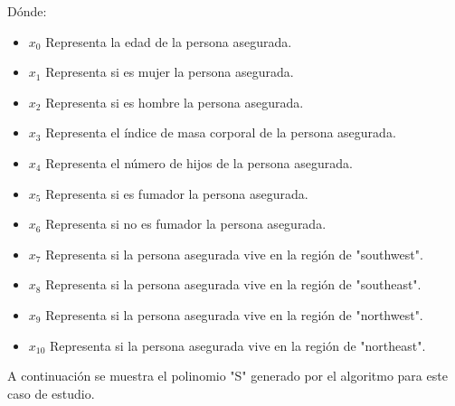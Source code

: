 \documentclass[letterpaper, 10 pt, conference]{ieeeconf}
\begin{document}
Dónde:
\begin{itemize}
    \item $x_0$ Representa la edad de la persona asegurada.
    \item $x_1$ Representa si es mujer la persona asegurada.
    \item $x_2$ Representa si es hombre  la persona asegurada.
    \item $x_3$ Representa el índice de masa corporal de la persona asegurada.
    \item $x_4$ Representa el número de hijos de la persona asegurada.
    \item $x_5$ Representa si es fumador la persona asegurada.
    \item $x_6$ Representa si no es fumador la persona asegurada.
    \item $x_7$ Representa si la persona asegurada vive en la región de "southwest".
    \item $x_8$ Representa si la persona asegurada vive en la región de "southeast".
    \item $x_9$ Representa si la persona asegurada vive en la región de "northwest".
    \item $x_{10}$ Representa si la persona asegurada vive en la región de "northeast".
\end{itemize}

\newpage

A continuación se muestra el polinomio "S" generado por el algoritmo para este caso de estudio.
\end{document}
